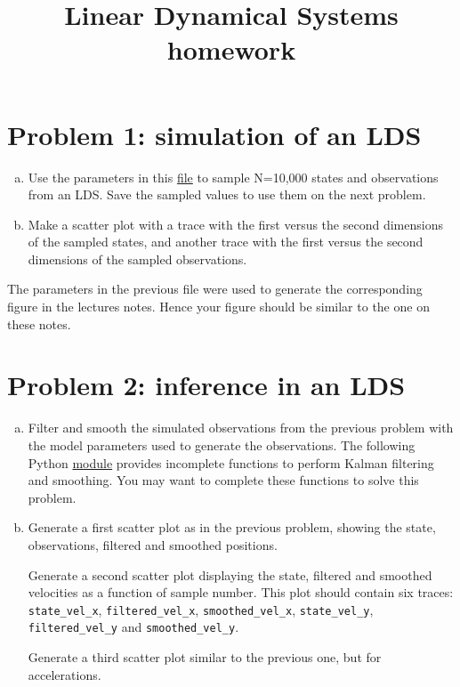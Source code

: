 \documentclass{article}
\title{Linear Dynamical Systems homework}
\author{}
\date{}
\begin{document}
\maketitle

\section*{Problem 1: simulation of an LDS}

\begin{enumerate}[(a)]

    \item Use the parameters in this
        \href{https://github.com/joacorapela/probabilisticModelingCourse/blob/master/lds/data/00000002_simulation_params.npz}{file}
        to sample N=10,000 states and observations from an LDS. Save the
        sampled values to use them on the next problem.

    \item Make a scatter plot with a trace with the first versus the second
        dimensions of the sampled states, and another trace with the first
        versus the second dimensions of the sampled observations.

\end{enumerate}

The parameters in the previous file were used to generate the corresponding
figure in the lectures notes. Hence your figure should be similar to the one on
these notes.

\section*{Problem 2: inference in an LDS}

\begin{enumerate}[(a)]

    \item Filter and smooth the simulated observations from the previous
        problem with the model parameters used to generate the observations.
        The following Python
        \href{https://github.com/joacorapela/probabilisticModelingCourse/blob/master/lds/code/src/inference.py}{module}
        provides incomplete functions to perform Kalman filtering and
        smoothing. You may want to complete these functions to solve this
        problem.

    \item Generate a first scatter plot as in the previous problem, showing the
        state, observations, filtered and smoothed positions.

        Generate a second scatter plot displaying the state, filtered and
        smoothed velocities as a function of sample number. This plot should
        contain six traces: \texttt{state\_vel\_x}, \texttt{filtered\_vel\_x},
        \texttt{smoothed\_vel\_x}, \texttt{state\_vel\_y},
        \texttt{filtered\_vel\_y} and \texttt{smoothed\_vel\_y}.

        Generate a third scatter plot similar to the previous one, but for
        accelerations.

\end{enumerate}
\end{document}
